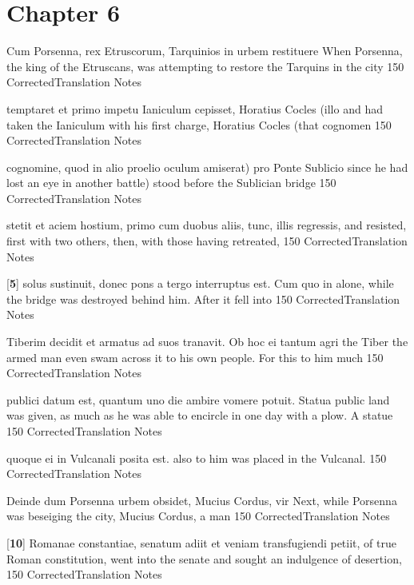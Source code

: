 \chapter*{Chapter 6} %
\label{sec:chapter_6}

\latline
  {Cum Porsenna, rex Etruscorum, Tarquinios in urbem restituere}
  { When Porsenna, the king of the Etruscans, was attempting to restore the Tarquins in the city }
  {150}
  { CorrectedTranslation }
  { Notes }


\latline
  {temptaret et primo impetu Ianiculum cepisset, Horatius Cocles (illo}
  { and had taken the Ianiculum with his first charge, Horatius Cocles (that cognomen }
  {150}
  { CorrectedTranslation }
  { Notes }


\latline
  {cognomine, quod in alio proelio oculum amiserat) pro Ponte Sublicio}
  { since he had lost an eye in another battle) stood before the Sublician bridge }
  {150}
  { CorrectedTranslation }
  { Notes }


\latline
  {stetit et aciem hostium, primo cum duobus aliis, tunc, illis regressis,}
  { and resisted, first with two others, then, with those having retreated, }
  {150}
  { CorrectedTranslation }
  { Notes }


\latline
  {[\textbf{5}] solus sustinuit, donec pons a tergo interruptus est.  Cum quo in}
  { alone, while the bridge was destroyed behind him.  After it fell into }
  {150}
  { CorrectedTranslation }
  { Notes }


\latline
  {Tiberim decidit et armatus ad suos tranavit.  Ob hoc ei tantum agri}
  { the Tiber the armed man even swam across it to his own people.  For this to him much   }
  {150}
  { CorrectedTranslation }
  { Notes }


\latline
  {publici datum est, quantum uno die ambire vomere potuit. Statua}
  { public land was given, as much as he was able to encircle in one day with a plow.  A statue }
  {150}
  { CorrectedTranslation }
  { Notes }


\latline
  {quoque ei in Vulcanali posita est.}
  { also to him was placed in the Vulcanal. }
  {150}
  { CorrectedTranslation }
  { Notes }


\latline
  {Deinde dum Porsenna urbem obsidet, Mucius Cordus, vir}
  { Next, while Porsenna was beseiging the city, Mucius Cordus, a man }
  {150}
  { CorrectedTranslation }
  { Notes }


\latline
  {[\textbf{10}] Romanae constantiae, senatum adiit et veniam transfugiendi petiit,}
  { of true Roman constitution, went into the senate and sought an indulgence of desertion, }
  {150}
  { CorrectedTranslation }
  { Notes }


